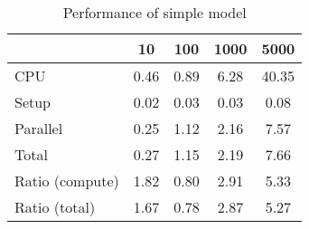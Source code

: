 \begin{table}[!h]
\centering
\caption{Performance of simple model}
\begin{tabular}{l*{4}{c}}\hline
& 10 &             100 &            1000 &            5000 \\ \hline
CPU &     0.46 &      0.89 &      6.28 &     40.35 \\
Setup &     0.02 &      0.03 &      0.03 &      0.08 \\
Parallel &     0.25 &      1.12 &      2.16 &      7.57 \\
Total &     0.27 &      1.15 &      2.19 &      7.66 \\
Ratio (compute) &     1.82 &      0.80 &      2.91 &      5.33 \\
Ratio (total) &     1.67 &      0.78 &      2.87 &      5.27 \\
\hline
\end{tabular}
\end{table}
